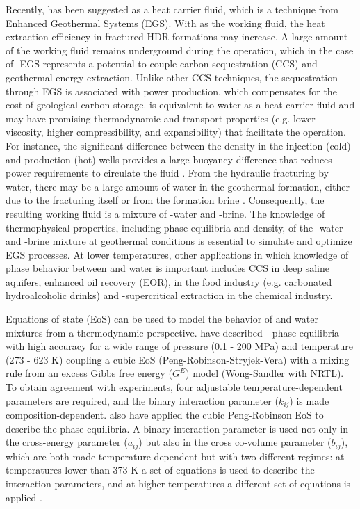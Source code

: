 Recently,  has been suggested as a heat carrier fluid, which is a technique from Enhanced Geothermal Systems (EGS).
With  as the working fluid, the heat extraction efficiency in fractured HDR formations may increase.  A large amount of the working fluid remains underground during the operation, which in the case of -EGS represents a potential to couple carbon sequestration (CCS) and geothermal energy extraction. Unlike other CCS techniques, the  sequestration through EGS is associated with power production, which compensates for the cost of geological carbon storage.  is equivalent to water as a heat carrier fluid and may have promising thermodynamic and transport properties (e.g. lower viscosity, higher compressibility, and expansibility) that facilitate the operation. For instance, the significant difference between the density in the injection (cold) and production (hot) wells provides a large buoyancy difference that reduces power requirements to circulate the fluid \cite{Wu2020}. From the hydraulic fracturing by water, there may be a large amount of water in the geothermal formation, either due to the fracturing itself or from the formation brine \cite{Wu2020}. Consequently, the resulting working fluid is a mixture of -water and -brine. The knowledge of thermophysical properties, including phase equilibria and density, of the -water and -brine mixture at geothermal conditions is essential to simulate and optimize EGS processes. At lower temperatures, other applications in which knowledge of phase behavior between  and water is important includes CCS in deep saline aquifers, enhanced oil recovery (EOR),  in the food industry (e.g. carbonated hydroalcoholic drinks) and -supercritical extraction in the chemical industry.

Equations of state (EoS) can be used to model the behavior of  and water mixtures from a thermodynamic perspective. \citeauthor{Zhao2016} \cite{Zhao2016} have described - phase equilibria with high accuracy for a wide range of pressure (0.1 - 200 MPa) and temperature (273 - 623 K) coupling a cubic EoS (Peng-Robinson-Stryjek-Vera) with a mixing rule from an excess Gibbs free energy ($G^{E}$) model (Wong-Sandler with NRTL). To obtain agreement with experiments, four adjustable temperature-dependent parameters are required, and the binary interaction parameter ($k_{ij}$) is made composition-dependent. \citeauthor{Pappa2009} \cite{Pappa2009} also have applied the cubic Peng-Robinson EoS to describe the phase equilibria. A binary interaction parameter is used not only in the cross-energy parameter ($a_{ij}$) but also in the cross co-volume parameter ($b_{ij}$), which are both made temperature-dependent but with two different regimes: at temperatures lower than 373 K a set of equations is used to describe the interaction parameters, and at higher temperatures a different set of equations is applied \cite{Pappa2009}.

